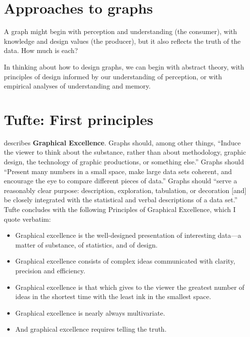 \documentclass[
  openany]{book}
\providecommand{\tightlist}{%
  \setlength{\itemsep}{0pt}\setlength{\parskip}{0pt}}
\begin{document}
\hypertarget{approaches-to-graphs}{%
\section{Approaches to graphs}\label{approaches-to-graphs}}

A graph might begin with perception and understanding (the consumer), with knowledge and design values (the producer), but it also reflects the truth of the data. How much is each?

In thinking about how to design graphs, we can begin with abstract theory, with principles of design informed by our understanding of perception, or with empirical analyses of understanding and memory.

\hypertarget{tufte-first-principles}{%
\section{Tufte: First principles}\label{tufte-first-principles}}

\citet{tufte2001visual} describes \textbf{Graphical Excellence}. Graphs should, among other things, ``Induce the viewer to think about the substance, rather than about methodology, graphic design, the technology of graphic productions, or something else.'' Graphs should ``Present many numbers in a small space, make large data sets coherent, and encourage the eye to compare different pieces of data.'' Graphs should ``serve a reasonably clear purpose: description, exploration, tabulation, or decoration {[}and{]} be closely integrated with the statistical and verbal descriptions of a data set.'' Tufte concludes with the following Principles of Graphical Excellence, which I quote verbatim:

\begin{itemize}
\tightlist
\item
  Graphical excellence is the well-designed presentation of interesting data---a matter of substance, of statistics, and of design.
\item
  Graphical excellence consists of complex ideas communicated with clarity, precision and efficiency.
\item
  Graphical excellence is that which gives to the viewer the greatest number of ideas in the shortest time with the least ink in the smallest space.
\item
  Graphical excellence is nearly always multivariate.
\item
  And graphical excellence requires telling the truth.
\end{itemize}
\end{document}
